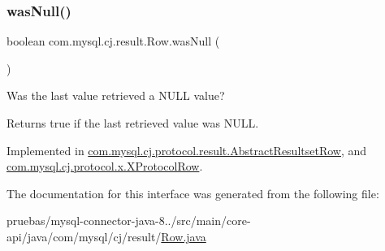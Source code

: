 \mbox{\label{interfacecom_1_1mysql_1_1cj_1_1result_1_1_row_a6a915f3dfaf8f9997f705b7762f9c6cb}} 
\subsubsection{\texorpdfstring{was\+Null()}{wasNull()}}
{\footnotesize\ttfamily boolean com.\+mysql.\+cj.\+result.\+Row.\+was\+Null (\begin{DoxyParamCaption}{ }\end{DoxyParamCaption})}

Was the last value retrieved a N\+U\+LL value?

\begin{DoxyReturn}{Returns}
true if the last retrieved value was N\+U\+LL. 
\end{DoxyReturn}


Implemented in \mbox{\hyperlink{classcom_1_1mysql_1_1cj_1_1protocol_1_1result_1_1_abstract_resultset_row_a9d1a54529c6a83e356e4d6bf079f8548}{com.\+mysql.\+cj.\+protocol.\+result.\+Abstract\+Resultset\+Row}}, and \mbox{\hyperlink{classcom_1_1mysql_1_1cj_1_1protocol_1_1x_1_1_x_protocol_row_ae6fd328d9a5ac92bdbb910fb9c8c043a}{com.\+mysql.\+cj.\+protocol.\+x.\+X\+Protocol\+Row}}.



The documentation for this interface was generated from the following file\+:\begin{DoxyCompactItemize}
\item 
pruebas/mysql-\/connector-\/java-\/8../src/main/core-\/api/java/com/mysql/cj/result/\mbox{\hyperlink{core-api_2java_2com_2mysql_2cj_2result_2_row_8java}{Row.\+java}}\end{DoxyCompactItemize}
